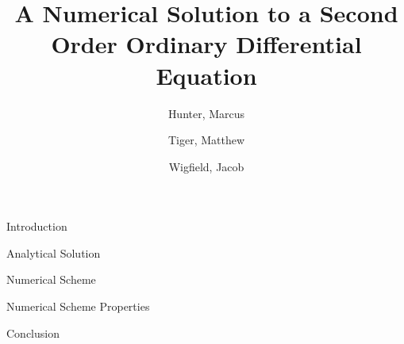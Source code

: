 \documentclass{article}
\title{
	{A Numerical Solution to a Second Order Ordinary Differential Equation}\\
}
\author{
	Hunter, Marcus \\
	\and
	Tiger, Matthew \\
	\and
	Wigfield, Jacob \\
}
\begin{document}
\maketitle
\newpage


\tableofcontents
\newpage


\begin{section}{Introduction}
  
\end{section}


\begin{section}{Analytical Solution}
  
\end{section}


\begin{section}{Numerical Scheme}\label{sec:scheme}
  
\end{section}


\begin{section}{Numerical Scheme Properties}\label{sec:scheme_prop}
  
\end{section}


\begin{section}{Conclusion}
  
\end{section}
\end{document}
